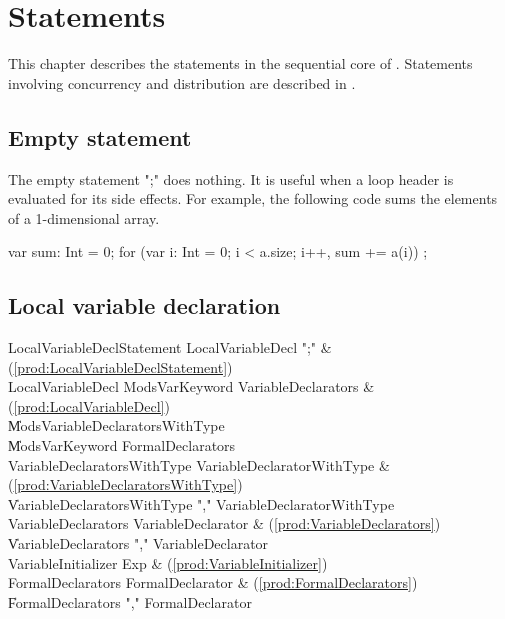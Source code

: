 \chapter{Statements}\label{XtenStatements}

This chapter describes the statements in the sequential core of
\Xten{}.  Statements involving concurrency and distribution
are described in .





\section{Empty statement}


The empty statement \xcd";" does nothing.  It is useful when a
loop header is evaluated for its side effects.  For example,
the following code sums the elements of a 1-dimensional array.

\begin{xten}
var sum: Int = 0;
for (var i: Int = 0; i < a.size; i++, sum += a(i))
    ;
\end{xten}

\section{Local variable declaration}

\begin{bbgrammar}
 LocalVariableDeclStatement    \: LocalVariableDecl \xcd";" & (\ref{prod:LocalVariableDeclStatement})\\%
 LocalVariableDecl    \: Mods\opt VarKeyword VariableDeclarators & (\ref{prod:LocalVariableDecl})\\%
    \| Mods\opt VariableDeclaratorsWithType\\
    \| Mods\opt VarKeyword FormalDeclarators\\
 VariableDeclaratorsWithType    \: VariableDeclaratorWithType & (\ref{prod:VariableDeclaratorsWithType})\\%
    \| VariableDeclaratorsWithType \xcd"," VariableDeclaratorWithType\\
 VariableDeclarators    \: VariableDeclarator & (\ref{prod:VariableDeclarators})\\%
    \| VariableDeclarators \xcd"," VariableDeclarator\\
 VariableInitializer    \: Exp & (\ref{prod:VariableInitializer})\\%
 FormalDeclarators    \: FormalDeclarator & (\ref{prod:FormalDeclarators})\\%
    \| FormalDeclarators \xcd"," FormalDeclarator\\

\end{bbgrammar}

